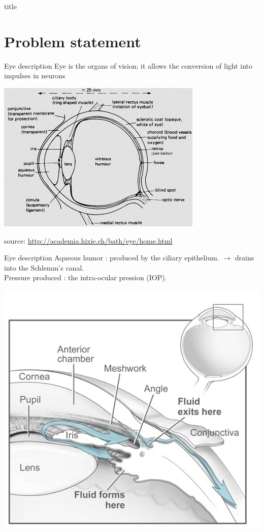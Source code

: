 

\begin{frame}{}
 title
\end{frame}

\section{Problem statement}

\begin{frame}{Eye description}
Eye is the organs of vision; it allows the conversion of light into impulses in neurons
\begin{center}
\includegraphics[width=.7\linewidth]{Eye.jpg}
\end{center}
\tiny{source: \url{http://academia.hixie.ch/bath/eye/home.html}}
\end{frame}

\begin{frame}{Eye description}
Aqueous humor : produced by the ciliary epithelium.
$\rightarrow$ drains into the Schlemm's canal.\\
Pressure produced : the intra-ocular pression (IOP).
\begin{center}
\includegraphics[width=.5\linewidth]{Humor.jpg}
\end{center}


\end{frame}

